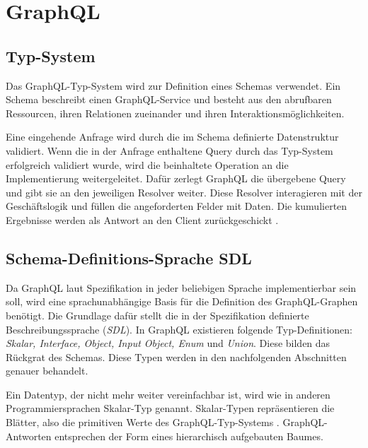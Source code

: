 \chapter{GraphQL}
\section{Typ-System}
Das GraphQL-Typ-System wird zur Definition eines Schemas verwendet.
Ein Schema beschreibt einen GraphQL-Service und besteht aus den abrufbaren Ressourcen, ihren Relationen zueinander und ihren Interaktionsmöglichkeiten.
\newline

Eine eingehende Anfrage wird durch die im Schema definierte Datenstruktur validiert.
Wenn die in der Anfrage enthaltene Query durch das Typ-System erfolgreich validiert wurde, wird die beinhaltete Operation an die Implementierung weitergeleitet.
Dafür zerlegt GraphQL die übergebene Query und gibt sie an den jeweiligen Resolver weiter. Diese Resolver interagieren mit der Geschäftslogik und füllen die angeforderten Felder mit Daten.
Die kumulierten Ergebnisse werden als Antwort an den Client zurückgeschickt \parencite[S. 57-58]{kress2020graphql} \parencite[Abs. Schemadefinition]{graphqlOnline}.

\section{Schema-Definitions-Sprache SDL}
Da GraphQL laut Spezifikation in jeder beliebigen Sprache implementierbar sein soll, wird eine sprachunabhängige Basis für die Definition des GraphQL-Graphen benötigt.
Die Grundlage dafür stellt die in der Spezifikation definierte Beschreibungssprache (\textit{SDL}). 
In GraphQL existieren folgende Typ-Definitionen: \textit{Skalar, Interface, Object, Input Object, Enum} und \textit{Union}.
Diese bilden das Rückgrat des Schemas.
Diese Typen werden in den nachfolgenden Abschnitten genauer behandelt.


Ein Datentyp, der nicht mehr weiter vereinfachbar ist, wird wie in anderen Programmiersprachen Skalar-Typ genannt.
Skalar-Typen repräsentieren die Blätter, also die primitiven Werte des GraphQL-Typ-Systems \parencite[S. 60]{kress2020graphql}.
GraphQL-Antworten entsprechen der Form eines hierarchisch aufgebauten Baumes.
\newline


